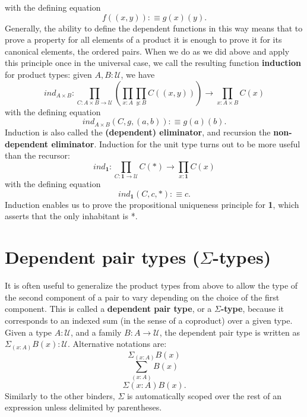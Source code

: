 \documentclass[letterpaper, 10 pt, conference]{ieeeconf}  %
\begin{document}
with the defining equation
\begin{equation}
    f((x,y)) :\equiv g(x)(y).
\end{equation}
Generally, the ability to define the dependent functions in this way means that to prove a property for all elements of a product it is enough to prove it for its canonical elements, the ordered pairs. When we do as we did above and apply this principle once in the universal case, we call the resulting function \textbf{induction} for product types: given $A,B : \mathcal{U}$, we have 
\begin{equation}
    ind_{A \times B} : \prod_{C:A\times B \rightarrow \mathcal{U}} (\prod_{x:A} \prod_{y:B} C((x,y))) \rightarrow \prod_{x: A \times B} C(x)
\end{equation}
with the defining equation
\begin{equation}
    ind_{A \times B}(C,g,(a,b)) :\equiv g(a)(b).
\end{equation}
Induction is also called the \textbf{(dependent) eliminator}, and recursion the \textbf{non-dependent eliminator}. Induction for the unit type turns out to be more useful than the recursor:
\begin{equation}
    ind_{\textbf{1}} : \prod_{C:\textbf{1} \rightarrow \mathcal{U}} C(*) \rightarrow \prod_{x:\textbf{1}} C(x)
\end{equation}
with the defining equation
\begin{equation}
    ind_{\textbf{1}}(C,c,*) :\equiv c.
\end{equation}
Induction enables us to prove the propositional uniqueness principle for \textbf{1}, which asserts that the only inhabitant is *.
\section{Dependent pair types ($\Sigma$-types)}
It is often useful to generalize the product types from above to allow the type of the second component of a pair to vary depending on the choice of the first component. This is called a \textbf{dependent pair type}, or a $\Sigma$\textbf{-type}, because it corresponds to an indexed sum (in the sense of a coproduct) over a given type. Given a type $A : \mathcal{U}$, and a family $B: A \rightarrow \mathcal{U}$, the dependent pair type is written as $\Sigma_{(x:A)}B(x) : \mathcal{U}$. Alternative notations are: 
\begin{equation}
    \Sigma_{(x:A)} B(x)
\end{equation}
\begin{equation}
    \sum_{(x:A)} B(x)
\end{equation}
\begin{equation}
    \Sigma (x:A) B(x).
\end{equation}
Similarly to the other binders, $\Sigma$ is automatically scoped over the rest of an expression unless delimited by parentheses. 
\end{document}

